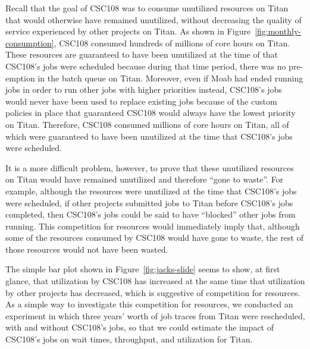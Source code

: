 

Recall that the goal of CSC108 was to consume unutilized resources on Titan
that would otherwise have remained unutilized, without decreasing the quality
of service experienced by other projects on Titan.  As shown in
Figure~\ref{fig:monthly-consumption}, CSC108 consumed hundreds of millions of
core hours on Titan. These resources are guaranteed to have been unutilized at
the time of that CSC108's jobs were scheduled because during that time period,
there was no pre-emption in the batch queue on Titan. Moreover, even if Moab
had ended running jobs in order to run other jobs with higher priorities
instead, CSC108's jobs would never have been used to replace existing jobs
because of the custom policies in place that guaranteed CSC108 would always
have the lowest priority on Titan. Therefore, CSC108 consumed millions of core
hours on Titan, all of which were guaranteed to have been unutilized at the
time that CSC108's jobs were scheduled.

It is a more difficult problem, however, to prove that these unutilized
resources on Titan would have remained unutilized and therefore ``gone to
waste''. For example, although the resources were unutilized at the time that
CSC108's jobs were scheduled, if other projects submitted jobs to Titan before
CSC108's jobs completed, then CSC108's jobs could be said to have ``blocked''
other jobs from running. This competition for resources would immediately imply
that, although some of the resources consumed by CSC108 would have gone to
waste, the rest of those resources would not have been wasted.

The simple bar plot shown in Figure~\ref{fig:jacks-slide} seems to show, at
first glance, that utilization by CSC108 has increased at the same time that
utilization by other projects has decreased, which is suggestive of competition
for resources. As a simple way to investigate this competition for resources,
we conducted an experiment in which three years' worth of job traces from Titan
were rescheduled, with and without CSC108's jobs, so that we could estimate
the impact of CSC108's jobs on wait times, throughput, and utilization for
Titan.

 

